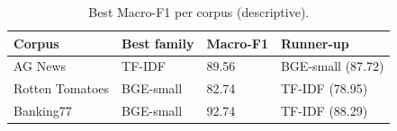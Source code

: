 \begin{table}[H]
\centering
\caption{Best Macro-F1 per corpus (descriptive).}
\small
\begin{tabular}{@{}llll@{}}
\toprule
Corpus & Best family & Macro-F1 & Runner-up \\
\midrule
AG News & TF-IDF & 89.56 & BGE-small (87.72) \\
Rotten Tomatoes & BGE-small & 82.74 & TF-IDF (78.95) \\
Banking77 & BGE-small & 92.74 & TF-IDF (88.29) \\
\bottomrule
\end{tabular}
\end{table}
